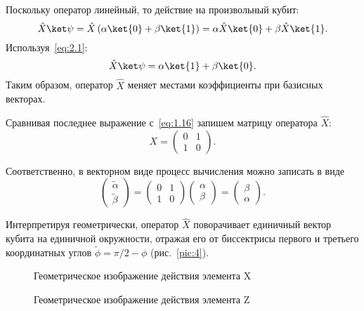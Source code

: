 \documentclass[pscyr,notitlepage]{hedwork}
\newcommand{\eq}[1]{\eqref{eq:#1}}
\newcommand{\pic}[1]{\ref{pic:#1}}
\renewcommand{\~}[1]{\widetilde{#1}}
\newcommand{\lb}{\left(}
\newcommand{\rb}{\right)}
\begin{document}
  Поскольку оператор линейный, то действие на произвольный кубит:
  \[
    \hat{X}\ket\psi = \hat{X}\lb\alpha\ket{0} + \beta\ket{1}\rb =
      \alpha\hat{X}\ket{0} + \beta\hat{X}\ket{1}.
  \]
  Используя~\eq{2.1}:
  \[
    \hat{X}\ket\psi = \alpha\ket{1} + \beta\ket{0}.
  \]
  Таким образом, оператор \( \hat{X} \) меняет местами коэффициенты при
  базисных векторах.
  
  Сравнивая последнее выражение с~\eq{1.16} запишем матрицу оператора
  \( \hat{X} \):
  \[
    X =
    \begin{pmatrix}
      0 & 1 \\ 1 & 0
    \end{pmatrix}.
  \]
  
  Соответственно, в векторном виде процесс вычисления можно записать в виде
  \[
    \begin{pmatrix}
      \~\alpha \\ \~\beta
    \end{pmatrix} =
    \begin{pmatrix}
      0 & 1 \\ 1 & 0
    \end{pmatrix}
    \begin{pmatrix}
      \alpha \\ \beta
    \end{pmatrix} =
    \begin{pmatrix}
      \beta \\ \alpha
    \end{pmatrix}.
  \]
  
  Интерпретируя геометрически, оператор \( \hat{X} \) поворачивает единичный
  вектор кубита на единичной окружности, отражая его от биссектрисы первого и
  третьего координатных углов \( \~\phi = \pi/2 - \phi \)
  (рис.~\pic{4}).~\cite{main}
    
  \begin{figure}[h!]
    \center
    \vspace{-1.2em}
     \hfill
    \parbox{.47\textwidth}{\caption{Геометрическое изображение действия
      элемента X} \label{pic:4}} \hfill
    \parbox{.47\textwidth}{\caption{Геометрическое изображение действия
      элемента Z} \label{pic:5}}
  \end{figure}
    
\end{document}
